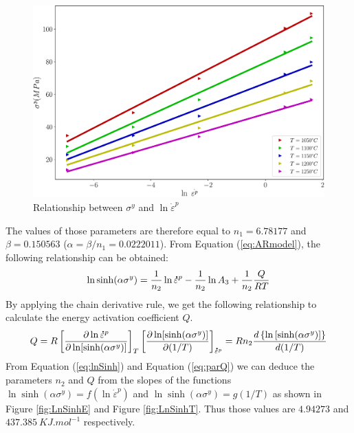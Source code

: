 \documentclass[twoside,english,1p,final,sort&compress]{elsarticle}
\theoremstyle{plain}
\newcommand{\mdot}[1]{\accentset{\mbox{\bfseries .}}{#1}}
\begin{document}
\begin{figure}[!ht]
\centering
\includegraphics[width=0.9\columnwidth]{Figures/LnSinhE0}
\caption{Relationship between $\sigma^y$ and $\ln \dot{\varepsilon}^p$}
\label{fig:LnSinhE0}
\end{figure}
The values of those parameters are therefore equal to $n_1=6.78177$ and $\beta=0.150563$ ($\alpha=\beta/n_1 = 0.0222011$).
From Equation (\ref{eq:ARmodel}), the following relationship can be obtained:
\begin{equation}
\label{eq:lnSinh}
\ln\sinh(\alpha\sigma^y) = \frac{1}{n_2}\ln \mdot\varepsilon^p  -  \frac{1}{n_2}\ln A_3 + \frac{1}{n_2} \frac{Q}{RT}
\end{equation}
By applying the chain derivative rule, we get the following relationship to calculate the energy activation coefficient $Q$.
\begin{equation}
\label{eq:parQ}
Q = R\left[\frac{\partial \ln \mdot\varepsilon^p}{\partial \ln [\sinh(\alpha\sigma^y)]}\right]_{T}\left[\frac{\partial \ln [\sinh(\alpha\sigma^y)]}{\partial (1/T)}\right]_{\mdot\varepsilon^p}= Rn_2\frac{d\left\{\ln\left[\sinh(\alpha\sigma^y)\right]\right\}}{d(1/T)}
\end{equation}
From Equation (\ref{eq:lnSinh}) and Equation (\ref{eq:parQ}) we can deduce the parameters $n_2 $ and $Q $ from the slopes of the functions $\ln \sinh(\alpha\sigma^y) = f(\ln \dot{\varepsilon}^p)$ and $\ln \sinh(\alpha\sigma^y) = g(1/T)$ as shown in Figure \ref{fig:LnSinhE} and Figure \ref{fig:LnSinhT}. Thus those values are $4.94273$ and $437.385\ KJ.mol^{-1}$ respectively.
\end{document}
